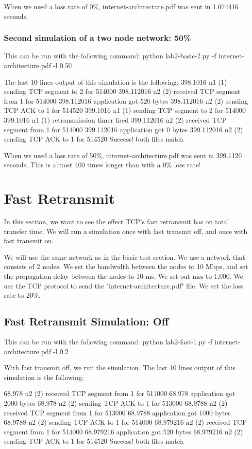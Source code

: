 \documentclass[fleqn,11pt]{article}
\begin{document}
When we used a loss rate of 0\%, internet-architecture.pdf was sent in 1.074416 seconds.

\subsubsection{Second simulation of a two node network: 50\%}
This can be run with the following command: python lab2-basic-2.py -f internet-architecture.pdf -l 0.50

The last 10 lines output of this simulation is the following:
398.1016 n1 (1) sending TCP segment to 2 for 514000
398.112016 n2 (2) received TCP segment from 1 for 514000
398.112016 application got 520 bytes
398.112016 n2 (2) sending TCP ACK to 1 for 514520
399.1016 n1 (1) sending TCP segment to 2 for 514000
399.1016 n1 (1) retransmission timer fired
399.112016 n2 (2) received TCP segment from 1 for 514000
399.112016 application got 0 bytes
399.112016 n2 (2) sending TCP ACK to 1 for 514520
Success! both files match

When we used a loss rate of 50\%, internet-architecture.pdf was sent in 399.1120 seconds. This is almost 400 times longer than with a 0\% loss rate!

\section{Fast Retransmit}
In this section, we want to see the effect TCP's fast retransmit has on total transfer time. We will run a simulation once with fast transmit off, and once with fast transmit on.

We will use the same network as in the basic test section. We use a network that consists of 2 nodes. We set the bandwidth between the nodes to 10 Mbps, and set the propagation delay between the nodes to 10 ms. We set out mss to 1,000. We use the TCP protocol to send the "internet-architecture.pdf" file. We set the loss rate to 20\%.

 \subsection{Fast Retransmit Simulation: Off}
This can be run with the following command: python lab2-fast-1.py -f internet-architecture.pdf -l 0.2

With fast transmit off, we run the simulation. The last 10 lines output of this simulation is the following:

68.978 n2 (2) received TCP segment from 1 for 511000
68.978 application got 2000 bytes
68.978 n2 (2) sending TCP ACK to 1 for 513000
68.9788 n2 (2) received TCP segment from 1 for 513000
68.9788 application got 1000 bytes
68.9788 n2 (2) sending TCP ACK to 1 for 514000
68.979216 n2 (2) received TCP segment from 1 for 514000
68.979216 application got 520 bytes
68.979216 n2 (2) sending TCP ACK to 1 for 514520
Success! both files match
\end{document}
